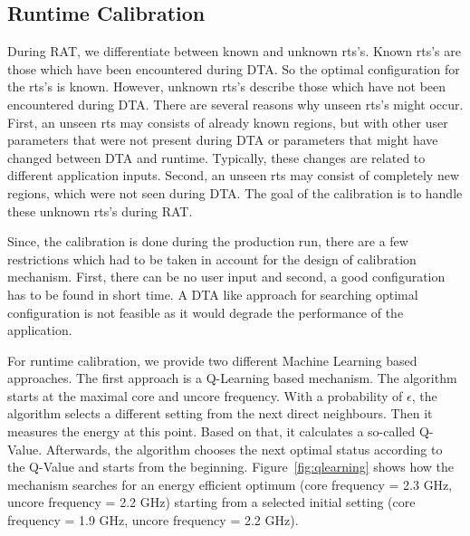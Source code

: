 \subsection{Runtime Calibration} \label{sec:calibration}

During RAT, we differentiate between known and unknown rts's. 
Known rts's are those which have been encountered during DTA. So the optimal configuration for the rts's is known. However, unknown rts's describe those which have not been encountered during DTA. There are several reasons why unseen rts's might occur. First, an unseen rts may consists of already known regions, but with other user parameters that were not present during DTA or parameters that might have changed between DTA and runtime. Typically, these changes are related to different application inputs. Second, an unseen rts may consist of completely new regions, which were not seen during DTA. The goal of the calibration is to handle these unknown rts's during RAT.

Since, the calibration is done during the production run, there are a few restrictions which had to be taken in account for the design of calibration mechanism. First, there can be no user input and second, a good configuration has to be found in short time. A DTA like approach for searching optimal configuration is not feasible as it would degrade the performance of the application.

For runtime calibration, we provide two different Machine Learning based approaches. The first approach is a Q-Learning based mechanism. The algorithm starts at the maximal core and uncore frequency. With a probability of {$\epsilon$}, the algorithm selects a different setting from the next direct neighbours. Then it measures the energy at this point. Based on that, it calculates a so-called Q-Value. Afterwards, the algorithm chooses the next optimal status according to the Q-Value and starts from the beginning. Figure~\ref{fig:qlearning} shows how the mechanism searches for an energy efficient optimum (core frequency = 2.3 GHz, uncore frequency = 2.2 GHz) starting from a selected initial setting (core frequency = 1.9 GHz, uncore frequency = 2.2 GHz).

